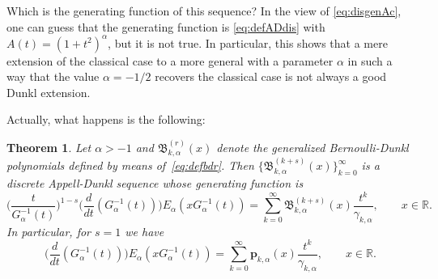 \documentclass[11pt]{article}
\theoremstyle{plain}
\newtheorem{theorem}{Theorem}[section]
\theoremstyle{remark}
\numberwithin{equation}{section} %
\newcommand{\Ea}{E_{\alpha}}
\newcommand{\B}{\mathfrak{B}}
\newcommand{\RR}{\mathbb{R}}
\newcommand{\cc}{\gamma}
\begin{document}
Which is the generating function of this sequence? 
In the view of \eqref{eq:disgenAc}, one can guess that the generating function is \eqref{eq:defADdis} with $A(t) = (1+t^2)^{\alpha}$, but it is not true. 
In particular, this shows that a mere extension of the classical case to a more general with a parameter $\alpha$ in such a way that the value $\alpha=-1/2$ recovers the classical case is not always a good Dunkl extension. 

Actually, what happens is the following:

\begin{theorem}
\label{teo:Bkr}
Let $\alpha>-1$ and $\B_{k,\alpha}^{(r)}(x)$ denote the generalized Bernoulli-Dunkl polynomials defined by means of~\eqref{eq:defbdr}. Then $\{\B_{k,\alpha}^{(k+s)}(x)\}_{k=0}^{\infty}$ is a discrete Appell-Dunkl sequence whose generating function is
\begin{equation}
\label{eq:Bkrs}
  \bigg(\frac{t}{G_{\alpha}^{-1}(t)}\bigg)^{1-s} 
  \Big(\frac{d}{dt}(G_{\alpha}^{-1}(t))\Big) 
  \Ea(x G_{\alpha}^{-1}(t)) 
  = \sum_{k=0}^{\infty} \B_{k,\alpha}^{(k+s)}(x) \frac{t^k}{\cc_{k,\alpha}}, \qquad x \in \RR.
\end{equation}
In particular, for $s=1$ we have
\begin{equation}
\label{eq:Bkr}
  \Big(\frac{d}{dt}(G_{\alpha}^{-1}(t))\Big) \Ea(x G_{\alpha}^{-1}(t)) 
  = \sum_{k=0}^{\infty} \mathbf{p}_{k,\alpha}(x) \frac{t^k}{\cc_{k,\alpha}}, \qquad x \in \RR.
\end{equation}
\end{theorem}
\end{document}
